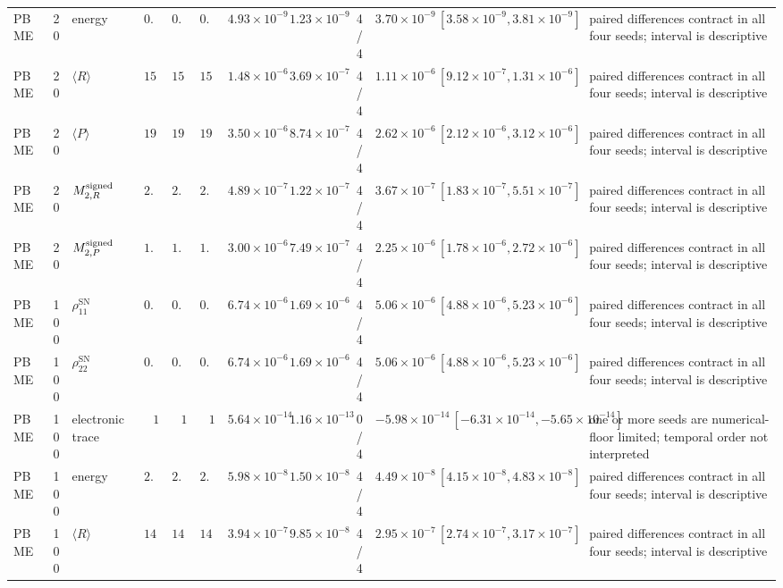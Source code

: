 \begin{landscape}
\begin{longtable}{l r l r r r r r r r L{0.15\textwidth}}
PBME & 20 & energy & $0.1$ & $0.1$ & $0.1$ & $4.93\times10^{-9}$ & $1.23\times10^{-9}$ & 4/4 & $3.70\times10^{-9}\,[3.58\times10^{-9},3.81\times10^{-9}]$ & paired differences contract in all four seeds; interval is descriptive \\
PBME & 20 & $\langle R\rangle$ & $15.3$ & $15.3$ & $15.3$ & $1.48\times10^{-6}$ & $3.69\times10^{-7}$ & 4/4 & $1.11\times10^{-6}\,[9.12\times10^{-7},1.31\times10^{-6}]$ & paired differences contract in all four seeds; interval is descriptive \\
PBME & 20 & $\langle P\rangle$ & $19.8$ & $19.8$ & $19.8$ & $3.50\times10^{-6}$ & $8.74\times10^{-7}$ & 4/4 & $2.62\times10^{-6}\,[2.12\times10^{-6},3.12\times10^{-6}]$ & paired differences contract in all four seeds; interval is descriptive \\
PBME & 20 & $M^{\rm signed}_{2,R}$ & $2.31$ & $2.31$ & $2.31$ & $4.89\times10^{-7}$ & $1.22\times10^{-7}$ & 4/4 & $3.67\times10^{-7}\,[1.83\times10^{-7},5.51\times10^{-7}]$ & paired differences contract in all four seeds; interval is descriptive \\
PBME & 20 & $M^{\rm signed}_{2,P}$ & $1.66$ & $1.66$ & $1.66$ & $3.00\times10^{-6}$ & $7.49\times10^{-7}$ & 4/4 & $2.25\times10^{-6}\,[1.78\times10^{-6},2.72\times10^{-6}]$ & paired differences contract in all four seeds; interval is descriptive \\
PBME & 100 & $\rho_{11}^{\mathrm{SN}}$ & $0.137$ & $0.137$ & $0.137$ & $6.74\times10^{-6}$ & $1.69\times10^{-6}$ & 4/4 & $5.06\times10^{-6}\,[4.88\times10^{-6},5.23\times10^{-6}]$ & paired differences contract in all four seeds; interval is descriptive \\
PBME & 100 & $\rho_{22}^{\mathrm{SN}}$ & $0.863$ & $0.863$ & $0.863$ & $6.74\times10^{-6}$ & $1.69\times10^{-6}$ & 4/4 & $5.06\times10^{-6}\,[4.88\times10^{-6},5.23\times10^{-6}]$ & paired differences contract in all four seeds; interval is descriptive \\
PBME & 100 & electronic trace & $1$ & $1$ & $1$ & $5.64\times10^{-14}$ & $1.16\times10^{-13}$ & 0/4 & $-5.98\times10^{-14}\,[-6.31\times10^{-14},-5.65\times10^{-14}]$ & one or more seeds are numerical-floor limited; temporal order not interpreted \\
PBME & 100 & energy & $2.5$ & $2.5$ & $2.5$ & $5.98\times10^{-8}$ & $1.50\times10^{-8}$ & 4/4 & $4.49\times10^{-8}\,[4.15\times10^{-8},4.83\times10^{-8}]$ & paired differences contract in all four seeds; interval is descriptive \\
PBME & 100 & $\langle R\rangle$ & $14.9$ & $14.9$ & $14.9$ & $3.94\times10^{-7}$ & $9.85\times10^{-8}$ & 4/4 & $2.95\times10^{-7}\,[2.74\times10^{-7},3.17\times10^{-7}]$ & paired differences contract in all four seeds; interval is descriptive \\

\end{longtable}
\end{landscape}
